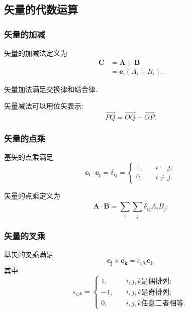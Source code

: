 \subsection{矢量的代数运算}
\subsubsection{矢量的加减}
矢量的加减法定义为
\begin{equation}
    \begin{aligned}
        \bm{C} & =\bm{A}\pm\bm{B}       \\
               & =\bm{e_i}(A_i\pm B_i).
    \end{aligned}
\end{equation}

矢量加法满足交换律和结合律.

矢量减法可以用位矢表示:
\begin{equation}
    \overrightarrow{PQ}=\overrightarrow{OQ}-\overrightarrow{OP}.
\end{equation}

\subsubsection{矢量的点乘}
基矢的点乘满足
\begin{equation}
    \bm{e_i}\cdot\bm{e_j}=\delta_{ij}=\begin{cases}
        1, & \quad i=j;     \\
        0, & \quad i\neq j.
    \end{cases}
\end{equation}

矢量的点乘定义为
\begin{equation}
    \bm{A}\cdot\bm{B}=\sum_{i}^{}\sum_{j}^{}\delta_{ij}A_iB_j.
\end{equation}

\subsubsection{矢量的叉乘}
基矢的叉乘满足
\begin{equation}
    \bm{e_j}\times\bm{e_k}=\epsilon_{ijk}\bm{e_i}.
\end{equation}
其中
\begin{equation}
    \epsilon_{ijk}=\begin{cases}
        1,  & \quad i, j, k \text{是偶排列};   \\
        -1, & \quad i, j, k \text{是奇排列};   \\
        0,  & \quad i, j, k \text{任意二者相等}.
    \end{cases}
\end{equation}


